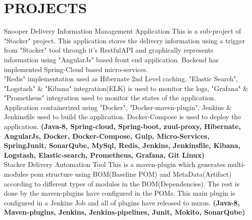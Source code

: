 \documentclass[]{cv-class}
\begin{document}
\section{PROJECTS}
\begin{entrylist}
	\entry
    {}
	{Snooper}    
    {Delivery Information Management Application}
	{This is a sub-project of "Stacker" project. This application stores the delivery information using a trigger from "Stacker" tool through it's RestfulAPI and graphically represents information using "AngularJs" based front end application. Backend has implemented Spring-Cloud based micro-services. \\"Redis" implementation used as Hibernate 2nd Level caching. "Elastic Search", "Logstash" \& "Kibana" integration(ELK) is used to monitor the logs, "Grafana" \& "Prometheus" integration used to monitor the states of the application. Application containerized using "Docker", "Docker-maven-plugin", Jenkins \& Jenkinsfile used to build the application. Docker-Compose is used to deploy the application. \textbf{(Java-8, Spring-cloud, Spring-boot, zuul-proxy, Hibernate, AngularJs, Docker, Docker-Compose, Gulp, Micro-Services, SpringJunit, SonarQube, MySql, Redis, Jenkins, Jenkinsfile, Kibana, Logstash, Elastic-search, Prometheus, Grafana, Git  Linux)}}
	\\
	\entry
    {}
	{Stacker}    
    {Delivery Automation Tool}
	{This is a maven-plugin which generates multi-modules pom structure using BOM(Baseline POM) and MetaData(Artifact) according to different types of 			modules in the BOM(Dependencies). The rest is done by the maven-plugins have configured in the POMs. This main plugin is configured in a Jenkins Job 		and all of plugins have released to nuxus. \textbf{(Java-8, Maven-plugins, Jenkins, Jenkins-pipelines, Junit, Mokito, SonarQube)}}
	\end{entrylist}
\newpage
\begin{aside}
\end{aside}
\end{document}
